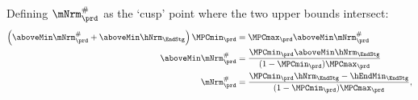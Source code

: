 \documentclass[titlepage, headings=optiontotocandhead]{econark}
\begin{document}
  \begin{comment} %
    That is, the realist's consumption function is bounded from above by both
    the \textit{unconstrained} optimist's problem already treated, as well as
    by the \textit{constrained} optimist's problem, which is a 45 degree line
    originating from $\Min{m}_{\prd}$ on the $m$-axis, as shown in
    Figure~\ref{fig:IntExpFOCInvPesReaOptNeed45Plot}. The same is true for
    the value function, as illustrated in Figure
    \ref{fig:IntExpFOCInvPesReaOptNeed45ValuePlot}.

    \hypertarget{IntExpFOCInvPesReaOptNeed45Plot}{}
    \begin{figure}
      \texttt{[image: ./Figures/IntExpFOCInvPesReaOptNeed45Plot]}
      \caption{45 Degree Line as Another Upper Bound}
      \label{fig:IntExpFOCInvPesReaOptNeed45Plot}
    \end{figure}

    \hypertarget{IntExpFOCInvPesReaOptNeed45ValuePlot}{}
    \begin{figure}
      \texttt{[image: ./Figures/IntExpFOCInvPesReaOptNeed45ValuePlot]}
      \caption{A Constrained Optimist's Value Function as Another Upper Bound}
      \label{fig:IntExpFOCInvPesReaOptNeed45ValuePlot}
    \end{figure}

  \end{comment}

  \newcommand{\mtCusp}{\ensuremath{\mNrm_{\prd}^{\#}}}



  Defining $\mtCusp$ as the `cusp' point where the two upper bounds
  intersect:
  \begin{equation*}\begin{gathered}\begin{aligned}
        \left(\aboveMin \mtCusp+\aboveMin \hNrm_{\EndStg}\right)\MPCmin_{\prd}  & =  \MPCmax_{\prd} \aboveMin \mtCusp \\
        \aboveMin \mtCusp  & =  \frac{\MPCmin_{\prd}\aboveMin \hNrm_{\EndStg}}{(1-\MPCmin_{\prd})\MPCmax_{\prd}} \\
        \mtCusp  & =  \frac{\MPCmin_{\prd}\hNrm_{\EndStg}-\hEndMin_{\EndStg}}{(1-\MPCmin_{\prd})\MPCmax_{\prd}},
      \end{aligned}\end{gathered}\end{equation*}
\end{document}
